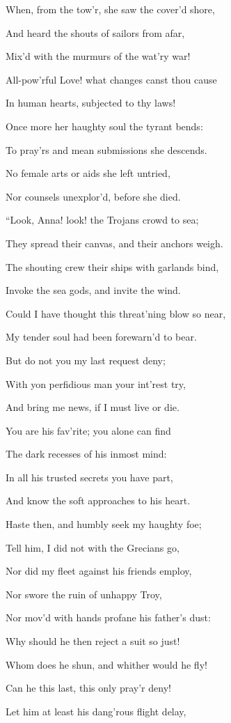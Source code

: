 When, from the tow’r, she saw the cover’d shore,

And heard the shouts of sailors from afar,

Mix’d with the murmurs of the wat’ry war!

All-pow’rful Love! what changes canst thou cause

In human hearts, subjected to thy laws!

Once more her haughty soul the tyrant bends:

To pray’rs and mean submissions she descends.

No female arts or aids she left untried,

Nor counsels unexplor’d, before she died.

“Look, Anna! look! the Trojans crowd to sea;

They spread their canvas, and their anchors weigh.

The shouting crew their ships with garlands bind,

Invoke the sea gods, and invite the wind.

Could I have thought this threat’ning blow so near,

My tender soul had been forewarn’d to bear.

But do not you my last request deny;

With yon perfidious man your int’rest try,

And bring me news, if I must live or die.

You are his fav’rite; you alone can find

The dark recesses of his inmost mind:

In all his trusted secrets you have part,

And know the soft approaches to his heart.

Haste then, and humbly seek my haughty foe;

Tell him, I did not with the Grecians go,

Nor did my fleet against his friends employ,

Nor swore the ruin of unhappy Troy,

Nor mov’d with hands profane his father’s dust:

Why should he then reject a suit so just!

Whom does he shun, and whither would he fly!

Can he this last, this only pray’r deny!

Let him at least his dang’rous flight delay,


